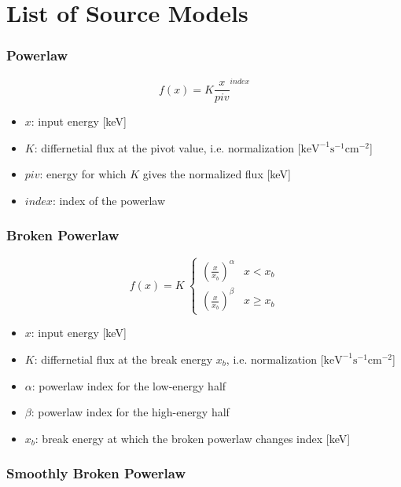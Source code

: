 \documentclass{report}
\begin{document}
\appendix
\chapter{List of Source Models}

\subsection*{Powerlaw}

\begin{equation} \label{powerlaw}
  f(x) = K \frac{x}{piv}^{index}
\end{equation}

\begin{itemize}
  \item $x$: input energy [keV]
  \item $K$: differnetial flux at the pivot value, i.e. normalization [$\text{keV}^{-1}\text{s}^{-1}\text{cm}^{-2}$]
  \item $piv$: energy for which $K$ gives the normalized flux [keV]
  \item $index$: index of the powerlaw
\end{itemize}

\subsection*{Broken Powerlaw}
\begin{equation}
  f(x)= K~\begin{cases}\left( \frac{x}{x_{b}} \right)^{\alpha} & x < x_{b} \\ \left( \frac{x}{x_{b}} \right)^{\beta} & x \ge x_{b} \end{cases}
\end{equation}


\begin{itemize}
  \item $x$: input energy [keV]
  \item $K$: differnetial flux at the break energy $x_b$, i.e. normalization [$\text{keV}^{-1}\text{s}^{-1}\text{cm}^{-2}$]
  \item $\alpha$: powerlaw index for the low-energy half
  \item $\beta$: powerlaw index for the high-energy half
  \item $x_b$: break energy at which the broken powerlaw changes index [keV]
\end{itemize}

\subsection*{Smoothly Broken Powerlaw}
\end{document}
